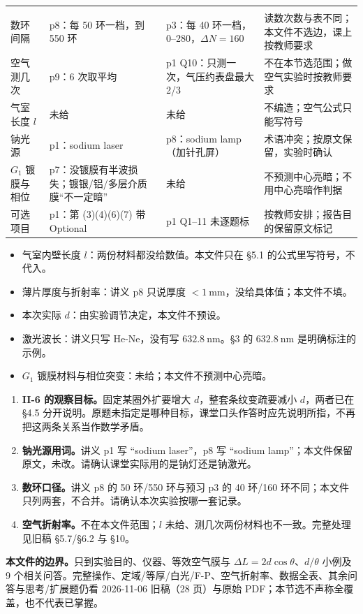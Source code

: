 \documentclass[11pt]{ctexart}
\begin{document}
\begin{center}
\small
\begin{longtable}{@{}L{2.9cm}L{4.3cm}L{4.3cm}L{4.2cm}@{}}
\toprule
{} &  &  & \\
\midrule
\endfirsthead
\toprule
{} &  &  & \\
\midrule
\endhead
数环间隔 & p8：每 50 环一档，到 550 环 & p3：每 40 环一档，0--280，\(\Delta N=160\) & 读数次数与表不同；本文件不选边，课上按教师要求\\
空气测几次 & p9：6 次取平均 & p1 Q10：只测一次，气压约表盘最大 2/3 & 不在本节选范围；做空气实验时按教师要求\\
气室长度 \(l\) & 未给 & 未给 & 不编造；空气公式只能写符号\\
钠光源 & p1：sodium laser & p8：sodium lamp（加针孔屏） & 术语冲突；按原文保留，实验时确认\\
\(G_1\) 镀膜与相位 & p7：没镀膜有半波损失；镀银/铝/多层介质膜“不一定暗” & 未给 & 不预测中心亮暗；不用中心亮暗作判据\\
可选项目 & p1：第 (3)(4)(6)(7) 带 Optional & p1 Q1--11 未逐题标 & 按教师安排；报告目的保留原文标记\\
\bottomrule
\end{longtable}
\end{center}


\begin{itemize}
\item 气室内壁长度 \(l\)：两份材料都没给数值。本文件只在 §5.1 的公式里写符号，不代入。
\item 薄片厚度与折射率：讲义 p8 只说厚度 \(<1\ \mathrm{mm}\)，没给具体值；本文件不填。
\item 本次实际 \(d\)：由实验调节决定，本文件不预设。
\item 激光波长：讲义只写 He-Ne，没有写 \(632.8\ \mathrm{nm}\)。§3 的 \(632.8\ \mathrm{nm}\) 是明确标注的示例。
\item \(G_1\) 镀膜材料与相位突变：未给；本文件不预测中心亮暗。
\end{itemize}


\begin{enumerate}[label=(\arabic*),leftmargin=2.2em]
\item \textbf{II-6 的观察目标。}固定某圈外扩要增大 \(d\)，整套条纹变疏要减小 \(d\)，两者已在 §4.5 分开说明。原题未指定是哪种目标，课堂口头作答时应先说明所指，不再把这两条关系当作数学矛盾。
\item \textbf{钠光源用词。}讲义 p1 写 “sodium laser”，p8 写 “sodium lamp”；本文件保留原文，未改。请确认课堂实际用的是钠灯还是钠激光。
\item \textbf{数环口径。}讲义 p8 的 50 环/550 环与预习 p3 的 40 环/160 环不同；本文件只列两套，不合并。请确认本次实验按哪一套记录。
\item \textbf{空气折射率。}不在本文件范围；\(l\) 未给、测几次两份材料也不一致。完整处理见旧稿 §5.7/§6.2 与 §10。
\end{enumerate}

\par\medskip

\textbf{本文件的边界。}只到实验目的、仪器、等效空气膜与 \(\Delta L=2d\cos\theta\)、\(d/\theta\) 小例及 9 个相关问答。完整操作、定域/等厚/白光/F-P、空气折射率、数据全表、其余问答与思考/扩展题仍看 2026-11-06 旧稿（28 页）与原始 PDF；本节选不声称全覆盖，也不代表已掌握。
\end{document}
